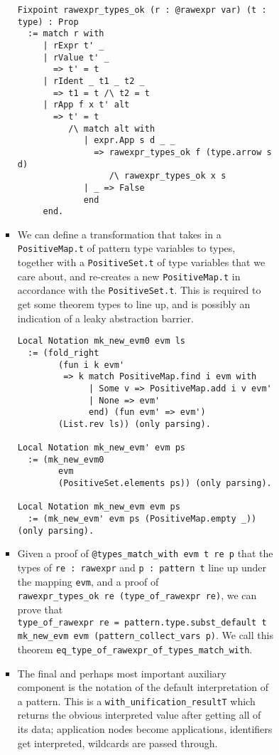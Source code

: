 \begin{itemize}
\begin{itemize}
\begin{itemize}
\begin{itemize}
\begin{itemize}
\begin{itemize}
\begin{verbatim}
Fixpoint rawexpr_types_ok (r : @rawexpr var) (t : type) : Prop
  := match r with
     | rExpr t' _
     | rValue t' _
       => t' = t
     | rIdent _ t1 _ t2 _
       => t1 = t /\ t2 = t
     | rApp f x t' alt
       => t' = t
          /\ match alt with
             | expr.App s d _ _
               => rawexpr_types_ok f (type.arrow s d)
                  /\ rawexpr_types_ok x s
             | _ => False
             end
     end.
\end{verbatim}
          \item
            We can define a transformation that takes in a
            \texttt{PositiveMap.t} of pattern type variables to types,
            together with a \texttt{PositiveSet.t} of type variables
            that we care about, and re-creates a new
            \texttt{PositiveMap.t} in accordance with the
            \texttt{PositiveSet.t}. This is required to get some theorem
            types to line up, and is possibly an indication of a leaky
            abstraction barrier.

\begin{verbatim}
Local Notation mk_new_evm0 evm ls
  := (fold_right
        (fun i k evm'
         => k match PositiveMap.find i evm with
              | Some v => PositiveMap.add i v evm'
              | None => evm'
              end) (fun evm' => evm')
        (List.rev ls)) (only parsing).

Local Notation mk_new_evm' evm ps
  := (mk_new_evm0
        evm
        (PositiveSet.elements ps)) (only parsing).

Local Notation mk_new_evm evm ps
  := (mk_new_evm' evm ps (PositiveMap.empty _)) (only parsing).
\end{verbatim}
          \item
            Given a proof of \texttt{@types\_match\_with\ evm\ t\ re\ p}
            that the types of \texttt{re\ :\ rawexpr} and
            \texttt{p\ :\ pattern\ t} line up under the mapping
            \texttt{evm}, and a proof of
            \texttt{rawexpr\_types\_ok\ re\ (type\_of\_rawexpr\ re)}, we
            can prove that
            \texttt{type\_of\_rawexpr\ re\ =\ pattern.type.subst\_default\ t\ mk\_new\_evm\ evm\ (pattern\_collect\_vars\ p)}.
            We call this theorem
            \texttt{eq\_type\_of\_rawexpr\_of\_types\_match\_with\textquotesingle{}}.
          \item
            The final and perhaps most important auxiliary component is
            the notation of the default interpretation of a pattern.
            This is a
            \texttt{with\_unification\_resultT\textquotesingle{}} which
            returns the obvious interpreted value after getting all of
            its data; application nodes become applications, identifiers
            get interpreted, wildcards are passed through.


\end{itemize}
\end{itemize}
\end{itemize}
\end{itemize}
\end{itemize}
\end{itemize}
